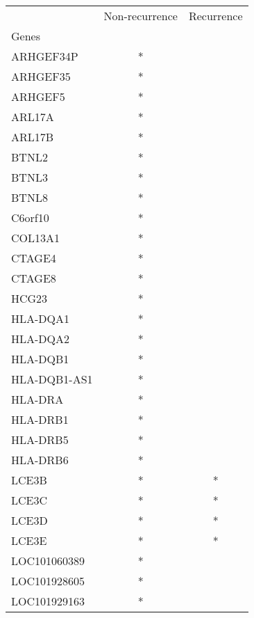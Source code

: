 \begin{tabular}{lcc}
\toprule
{} & Non-recurrence & Recurrence \\
Genes        &                &            \\
\midrule
ARHGEF34P    &              * &            \\
ARHGEF35     &              * &            \\
ARHGEF5      &              * &            \\
ARL17A       &              * &            \\
ARL17B       &              * &            \\
BTNL2        &              * &            \\
BTNL3        &              * &            \\
BTNL8        &              * &            \\
C6orf10      &              * &            \\
COL13A1      &              * &            \\
CTAGE4       &              * &            \\
CTAGE8       &              * &            \\
HCG23        &              * &            \\
HLA-DQA1     &              * &            \\
HLA-DQA2     &              * &            \\
HLA-DQB1     &              * &            \\
HLA-DQB1-AS1 &              * &            \\
HLA-DRA      &              * &            \\
HLA-DRB1     &              * &            \\
HLA-DRB5     &              * &            \\
HLA-DRB6     &              * &            \\
LCE3B        &              * &          * \\
LCE3C        &              * &          * \\
LCE3D        &              * &          * \\
LCE3E        &              * &          * \\
LOC101060389 &              * &            \\
LOC101928605 &              * &            \\
LOC101929163 &              * &            \\

\end{tabular}
